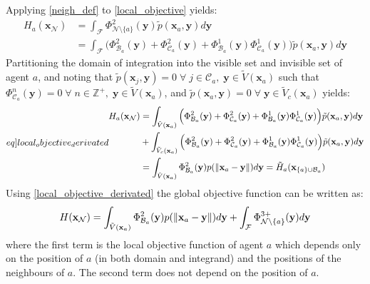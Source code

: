 Applying \eqref{neigh_def} to \eqref{local_objective} yields:
\begin{equation}
  \begin{split}
    H_{a}(\mathbf{x}_{\mathcal{N}}) &= \int_{\mathcal{F}}\Phi^{2}_{\mathcal{N}\setminus\{a\}}(\mathbf{y})\tilde{p}(\mathbf{x}_{a}, \mathbf{y})d\mathbf{y}\\
    &= \int_{\mathcal{F}}\Big(\Phi^{2}_{\mathcal{B}_{a}}(\mathbf{y}) + \Phi^{2}_{\mathcal{C}_{a}}(\mathbf{y}) + \Phi^{1}_{\mathcal{B}_{a}}(\mathbf{y})\Phi^{1}_{\mathcal{C}_{a}}(\mathbf{y})\Big)\tilde{p}(\mathbf{x}_{a}, \mathbf{y})d\mathbf{y}
  \end{split}
\end{equation}
Partitioning the domain of integration into the visible set and invisible set of agent $a$, and noting that $\tilde{p}(\mathbf{x}_{j}, \mathbf{y}) = 0\;\forall\;j\in\mathcal{C}_{a},\;\mathbf{y}\in\tilde{V}(\mathbf{x}_{a})$ such that
$\Phi^{n}_{\mathcal{C}_{a}}(\mathbf{y}) = 0\;\forall\;n\in\mathbb{Z}^{+},\;\mathbf{y}\in\tilde{V}(\mathbf{x}_{a})$, and $\tilde{p}(\mathbf{x}_{a}, \mathbf{y}) = 0\;\forall\;\mathbf{y}\in\tilde{V}_{c}(\mathbf{x}_{a})$ yields:
\begin{equation}\label[eq]{local_objective_derivated}
  \begin{split}
    H_{a}(\mathbf{x}_{\mathcal{N}}) &= \int_{\tilde{V}(\mathbf{x}_{a})}\Big(\Phi^{2}_{\mathcal{B}_{a}}(\mathbf{y}) + \Phi^{2}_{\mathcal{C}_{a}}(\mathbf{y}) + \Phi^{1}_{\mathcal{B}_{a}}(\mathbf{y})\Phi^{1}_{\mathcal{C}_{a}}(\mathbf{y})\Big)\tilde{p}(\mathbf{x}_{a}, \mathbf{y})d\mathbf{y}\\
    &+ \int_{\tilde{V}_{c}(\mathbf{x}_{a})}\Big(\Phi^{2}_{\mathcal{B}_{a}}(\mathbf{y}) + \Phi^{2}_{\mathcal{C}_{a}}(\mathbf{y}) + \Phi^{1}_{\mathcal{B}_{a}}(\mathbf{y})\Phi^{1}_{\mathcal{C}_{a}}(\mathbf{y})\Big)\tilde{p}(\mathbf{x}_{a}, \mathbf{y})d\mathbf{y}\\
    &= \int_{\tilde{V}(\mathbf{x}_{a})}\Phi^{2}_{\mathcal{B}_{a}}(\mathbf{y})p(\norm{\mathbf{x}_{a}-\mathbf{y}})d\mathbf{y} = \tilde{H}_{a}(\mathbf{x}_{\{a\}\cup\mathcal{B}_{a}})
  \end{split}
\end{equation}
Using \eqref{local_objective_derivated} the global objective function can be written as:
\begin{equation}
  H(\mathbf{x}_{\mathcal{N}}) = \int_{\tilde{V}(\mathbf{x}_{a})}\Phi^{2}_{\mathcal{B}_{a}}(\mathbf{y})p(\left\lVert\mathbf{x}_{a}-\mathbf{y}\right\rVert)d\mathbf{y} + \int_{\mathcal{F}}\Phi^{3+}_{\mathcal{N}\setminus\{a\}}(\mathbf{y})d\mathbf{y}
\end{equation}
where the first term is the local objective function of agent $a$ which depends only on the position of $a$ (in both domain and integrand) and the positions of the neighbours of $a$. The second term does not depend on the position of $a$.


